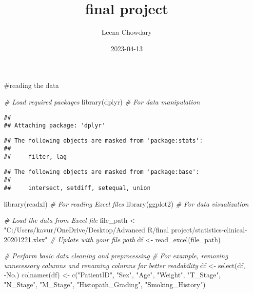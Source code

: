 \documentclass[
]{article}
\title{final project}
\author{Leena Chowdary}
\date{2023-04-13}
\newenvironment{Shaded}{\begin{snugshade}}{\end{snugshade}}
\newcommand{\CommentTok}[1]{\textcolor[rgb]{0.56,0.35,0.01}{\textit{#1}}}
\newcommand{\FunctionTok}[1]{\textcolor[rgb]{0.00,0.00,0.00}{#1}}
\newcommand{\NormalTok}[1]{#1}
\newcommand{\OtherTok}[1]{\textcolor[rgb]{0.56,0.35,0.01}{#1}}
\newcommand{\SpecialCharTok}[1]{\textcolor[rgb]{0.00,0.00,0.00}{#1}}
\newcommand{\StringTok}[1]{\textcolor[rgb]{0.31,0.60,0.02}{#1}}
\begin{document}
\maketitle

\#reading the data

\begin{Shaded}
\begin{Highlighting}[]
\CommentTok{\# Load required packages}
\FunctionTok{library}\NormalTok{(dplyr)    }\CommentTok{\# For data manipulation}
\end{Highlighting}
\end{Shaded}

\begin{verbatim}
## 
## Attaching package: 'dplyr'
\end{verbatim}

\begin{verbatim}
## The following objects are masked from 'package:stats':
## 
##     filter, lag
\end{verbatim}

\begin{verbatim}
## The following objects are masked from 'package:base':
## 
##     intersect, setdiff, setequal, union
\end{verbatim}

\begin{Shaded}
\begin{Highlighting}[]
\FunctionTok{library}\NormalTok{(readxl)  }\CommentTok{\# For reading Excel files}
\FunctionTok{library}\NormalTok{(ggplot2)  }\CommentTok{\# For data visualization}


\CommentTok{\# Load the data from Excel file}
\NormalTok{file\_path }\OtherTok{\textless{}{-}} \StringTok{"C:/Users/kavur/OneDrive/Desktop/Advanced R/final project/statistics{-}clinical{-}20201221.xlsx"}  \CommentTok{\# Update with your file path}
\NormalTok{df }\OtherTok{\textless{}{-}} \FunctionTok{read\_excel}\NormalTok{(file\_path)}

\CommentTok{\# Perform basic data cleaning and preprocessing}
\CommentTok{\# For example, removing unnecessary columns and renaming columns for better readability}
\NormalTok{df }\OtherTok{\textless{}{-}} \FunctionTok{select}\NormalTok{(df, }\SpecialCharTok{{-}}\NormalTok{No.)}
\FunctionTok{colnames}\NormalTok{(df) }\OtherTok{\textless{}{-}} \FunctionTok{c}\NormalTok{(}\StringTok{"PatientID"}\NormalTok{, }\StringTok{"Sex"}\NormalTok{, }\StringTok{"Age"}\NormalTok{, }\StringTok{"Weight"}\NormalTok{, }\StringTok{"T\_Stage"}\NormalTok{, }\StringTok{"N\_Stage"}\NormalTok{, }\StringTok{"M\_Stage"}\NormalTok{, }\StringTok{"Histopath\_Grading"}\NormalTok{, }\StringTok{"Smoking\_History"}\NormalTok{)}
\end{Highlighting}
\end{Shaded}
\end{document}
